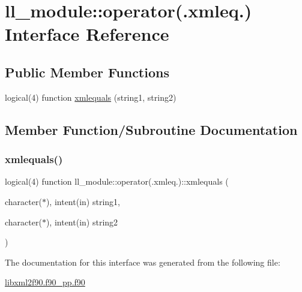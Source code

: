 \hypertarget{interfacell__module_1_1operator_07_8xmleq_8_08}{}\section{ll\+\_\+module\+:\+:operator(.xmleq.) Interface Reference}
\label{interfacell__module_1_1operator_07_8xmleq_8_08}
\subsection*{Public Member Functions}
\begin{DoxyCompactItemize}
\item 
logical(4) function \hyperlink{interfacell__module_1_1operator_07_8xmleq_8_08_a11731a3d71532a883810fc979ffaea0a}{xmlequals} (string1, string2)
\end{DoxyCompactItemize}


\subsection{Member Function/\+Subroutine Documentation}
\mbox{\label{interfacell__module_1_1operator_07_8xmleq_8_08_a11731a3d71532a883810fc979ffaea0a}} 
\subsubsection{\texorpdfstring{xmlequals()}{xmlequals()}}
{\footnotesize\ttfamily logical(4) function ll\+\_\+module\+::operator(.xmleq.)\+::xmlequals (\begin{DoxyParamCaption}\item[{character($\ast$), intent(in)}]{string1,  }\item[{character($\ast$), intent(in)}]{string2 }\end{DoxyParamCaption})}



The documentation for this interface was generated from the following file\+:\begin{DoxyCompactItemize}
\item 
\hyperlink{libxml2f90_8f90__pp_8f90}{libxml2f90.\+f90\+\_\+pp.\+f90}\end{DoxyCompactItemize}
